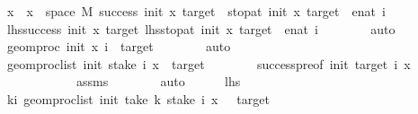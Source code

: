 \begin{isabellebody}
\ {\isachardoublequoteopen}x\ {\isasymin}\ {\isacharbraceleft}{\kern0pt}x\ {\isasymin}\ space\ M{\isachardot}{\kern0pt}\ success\ {\isacharparenleft}{\kern0pt}init{\isacharparenright}{\kern0pt}\ x\ {\isacharparenleft}{\kern0pt}target{\isacharparenright}{\kern0pt}\ {\isasymand}\ stop{\isacharunderscore}{\kern0pt}at\ {\isacharparenleft}{\kern0pt}init{\isacharparenright}{\kern0pt}\ x\ {\isacharparenleft}{\kern0pt}target{\isacharparenright}{\kern0pt}\ {\isacharequal}{\kern0pt}\ enat\ i{\isacharbraceright}{\kern0pt}{\isachardoublequoteclose}\isanewline
\ \ \ \ \isamarkupfalse%
\ \isamarkupfalse%
\ lhs{}{\isacharcolon}{\kern0pt}{\isachardoublequoteopen}success\ {\isacharparenleft}{\kern0pt}init{\isacharparenright}{\kern0pt}\ x\ {\isacharparenleft}{\kern0pt}target{\isacharparenright}{\kern0pt}{\isachardoublequoteclose}\ lhs{}{\isacharcolon}{\kern0pt}{\isachardoublequoteopen}stop{\isacharunderscore}{\kern0pt}at\ {\isacharparenleft}{\kern0pt}init{\isacharparenright}{\kern0pt}\ x\ {\isacharparenleft}{\kern0pt}target{\isacharparenright}{\kern0pt}\ {\isacharequal}{\kern0pt}\ enat\ i{\isachardoublequoteclose}\isanewline
\ \ \ \ \ \ \isamarkupfalse%
\ auto\isanewline
\ \ \ \ \isamarkupfalse%
\ \isamarkupfalse%
\ {\isachardoublequoteopen}geom{\isacharunderscore}{\kern0pt}proc\ init\ x\ i\ {\isacharequal}{\kern0pt}\ target{\isachardoublequoteclose}\isanewline
\ \ \ \ \ \ \isamarkupfalse%
\ auto\isanewline
\ \ \ \ \isamarkupfalse%
\ \isamarkupfalse%
\ {\isachardoublequoteopen}geom{\isacharunderscore}{\kern0pt}proc{\isacharunderscore}{\kern0pt}list\ init\ {\isacharparenleft}{\kern0pt}stake\ i\ x{\isacharparenright}{\kern0pt}\ {\isacharequal}{\kern0pt}\ target{\isachardoublequoteclose}\isanewline
\ \ \ \ \ \ \isamarkupfalse%
\ success{\isacharunderscore}{\kern0pt}pre{\isacharbrackleft}{\kern0pt}of\ init\ target\ i\ x{\isacharbrackright}{\kern0pt}\isanewline
\ \ \ \ \ \ \ \ \ \ \ \ assms\isanewline
\ \ \ \ \ \ \isamarkupfalse%
\ auto\isanewline
\ \ \ \ \isamarkupfalse%
\ lhs{}\ \isamarkupfalse%
\ {\isachardoublequoteopen}{\isasymforall}k{\isacharless}{\kern0pt}i{\isachardot}{\kern0pt}\ geom{\isacharunderscore}{\kern0pt}proc{\isacharunderscore}{\kern0pt}list\ {\isacharparenleft}{\kern0pt}init{\isacharparenright}{\kern0pt}\ {\isacharparenleft}{\kern0pt}take\ k\ {\isacharparenleft}{\kern0pt}stake\ i\ x{\isacharparenright}{\kern0pt}{\isacharparenright}{\kern0pt}\ {\isasymnotin}\ {\isacharbraceleft}{\kern0pt}{}{\isacharcomma}{\kern0pt}\ target{\isacharbraceright}{\kern0pt}{\isachardoublequoteclose}\ \isanewline

\end{isabellebody}
